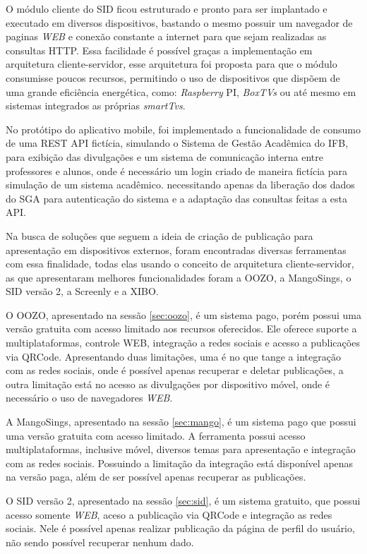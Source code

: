 O módulo cliente do SID ficou estruturado e pronto para ser implantado e executado em diversos dispositivos, bastando o mesmo possuir um navegador de paginas \textit{WEB} e conexão constante a internet para que sejam realizadas as consultas HTTP. Essa facilidade é possível graças a implementação em arquitetura cliente-servidor, esse arquitetura foi proposta para que o módulo consumisse poucos recursos, permitindo o uso de dispositivos que dispõem de uma grande eficiência energética, como: \textit{Raspberry} PI, \textit{BoxTVs} ou até mesmo em sistemas integrados as próprias \textit{smartTvs}.

No protótipo do aplicativo mobile, foi implementado a funcionalidade de consumo de uma REST API fictícia, simulando o Sistema de Gestão Acadêmica do IFB, para exibição das divulgações e um sistema de comunicação interna entre professores e alunos, onde é necessário um login criado de maneira fictícia para simulação de um sistema acadêmico. necessitando apenas da liberação dos dados do SGA para autenticação do sistema e a adaptação das consultas feitas a esta API.

Na busca de soluções que seguem a ideia de criação de publicação para apresentação em dispositivos externos, foram encontradas diversas ferramentas com essa finalidade, todas elas usando o conceito de arquitetura cliente-servidor, as que apresentaram melhores funcionalidades foram a OOZO, a MangoSings, o SID versão 2, a Screenly e a XIBO.

O OOZO, apresentado na sessão \ref{sec:oozo}, é um sistema pago, porém possui uma versão gratuita com acesso limitado aos recursos oferecidos. Ele oferece suporte a multiplataformas, controle WEB, integração a redes sociais e acesso a publicações via QRCode. Apresentando duas limitações, uma é no que tange a integração com as redes sociais, onde é possível apenas recuperar e deletar publicações, a outra limitação está no acesso as divulgações por dispositivo móvel, onde é necessário o uso de navegadores \textit{WEB}. 

A MangoSings, apresentado na sessão \ref{sec:mango}, é um sistema pago que possui uma versão gratuita com acesso limitado. A ferramenta possui acesso multiplataformas, inclusive móvel, diversos temas para apresentação e integração com as redes sociais. Possuindo a limitação da integração está disponível apenas na versão paga, além de ser possível apenas recuperar as publicações.

O SID versão 2, apresentado na sessão \ref{sec:sid}, é um sistema gratuito, que possui acesso somente \textit{WEB}, aceso a publicação via QRCode e integração as redes sociais. Nele é possível apenas realizar publicação da página de perfil do usuário, não sendo possível recuperar nenhum dado.

